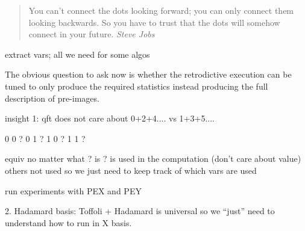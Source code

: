 \documentclass{article}
\begin{document}
\begin{refsection}
\begin{quote}
You can’t connect the dots looking forward; you can only connect them
looking backwards.  So you have to trust that the dots will somehow
connect in your future. \emph{Steve Jobs}
\end{quote}



extract vars; all we need for some algos

The obvious question to ask now is whether the retrodictive execution
can be tuned to only produce the required statistics instead producing
the full description of pre-images. 

insight 1: qft does not care about 0+2+4.... vs 1+3+5....

0 0 ?
0 1 ?
1 0 ?
1 1 ?

equiv no matter what ? is
? is used in the computation (don't care about value)
others not used
so we just need to keep track of which vars are used

run experiments with PEX and PEY





2. Hadamard basis: Toffoli + Hadamard is universal so we “just” need to understand how to run in X basis. 


\end{refsection}
\end{document}
